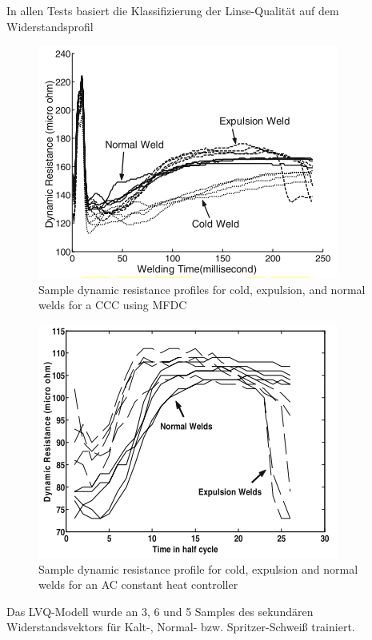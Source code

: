 \documentclass[english,ngerman]{tudscrreprt}
\begin{document}
In allen Tests basiert die Klassifizierung der  Linse-Qualität auf dem Widerstandsprofil
\begin{figure}[H]
\centering
\includegraphics{./Bilder/Sample dynamic resistance profiles for cold, expulsion, and normal welds for a CCC using MFDC.png}
\caption{Sample dynamic resistance profiles for cold, expulsion, and normal welds for a CCC using MFDC}\label{fgg:MFDC_DR}
\end{figure}
\begin{figure}[H]
\centering
\includegraphics{./Bilder/Sample dynamic resistance profile for cold, expulsion and normal welds for an AC constant heat controller.png}
\caption{Sample dynamic resistance profile for cold, expulsion and normal welds for an AC constant heat controller}\label{fgg:AC_DR}
\end{figure}


Das LVQ-Modell wurde an 3, 6 und 5 Samples des sekundären Widerstandsvektors für Kalt-, Normal- bzw. Spritzer-Schweiß trainiert.
 
\end{document}
